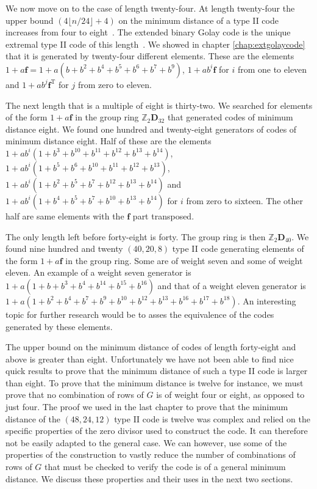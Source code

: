 We now move on to the case of length twenty-four.
At length twenty-four the upper bound $(4\lfloor n/24 \rfloor + 4)$ on the minimum distance of a type II code increases from four to eight~\cite[p.~346]{huf03}.
The extended binary Golay code is the unique extremal type II code of this length~\cite[p.~401]{huf03}.
We showed in chapter \ref{chap:extgolaycode} that it is generated by twenty-four different elements.
These are the elements $1+a\mathbf{f} = 1 + a(b + b^2 + b^4 + b^5 + b^6 + b^7 + b^9)$, $1+ab^i\mathbf{f}$ for $i$ from one to eleven and $1+ab^j\mathbf{f}^{\textrm{T}}$ for $j$ from zero to eleven.

The next length that is a multiple of eight is thirty-two.
We searched for elements of the form $1 + a \mathbf{f}$ in the group ring $\mathbb{Z}_2 \mathbf{D}_{32}$ that generated codes of minimum distance eight.
We found one hundred and twenty-eight generators of codes of minimum distance eight.
Half of these are the elements $1 + a b^i ( 1 + b^3 + b^{10} + b^{11} + b^{12} + b^{13} + b^{14})$, $1 + a b^i ( 1 + b^5 + b^6 + b^{10} + b^{11} + b^{12} + b^{13} )$, $1 + a b^i ( 1 + b^2 + b^5 + b^7 + b^{12} + b^{13} + b^{14})$ and $1 + a b^i ( 1 + b^4 + b^5 + b^7 + b^{10} + b^{13} + b^{14})$ for $i$ from zero to sixteen.
The other half are same elements with the $\mathbf{f}$ part transposed.

The only length left before forty-eight is forty.
The group ring is then $\mathbb{Z}_2 \mathbf{D}_{40}$.
We found nine hundred and twenty $(40,20,8)$ type II code generating elements of the form $1 + a \mathbf{f}$ in the group ring.
Some are of weight seven and some of weight eleven.
An example of a weight seven generator is $1 + a ( 1 + b + b^3 + b^4 + b^{14} + b^{15} + b^{16} )$ and that of a weight eleven generator is $1 + a ( 1 + b^2 + b^4 + b^7 + b^9 + b^{10} + b^{12} + b^{13} + b^{16} + b^{17} + b^{18})$.
An interesting topic for further research would be to asses the equivalence of the codes generated by these elements.

The upper bound on the minimum distance of codes of length forty-eight and above is greater than eight.
Unfortunately we have not been able to find nice quick results to prove that the minimum distance of such a type II code is larger than eight.
To prove that the minimum distance is twelve for instance, we must prove that no combination of rows of $G$ is of weight four or eight, as opposed to just four.
The proof we used in the last chapter to prove that the minimum distance of the $(48,24,12)$ type II code is twelve was complex and relied on the specific properties of the zero divisor used to construct the code.
It can therefore not be easily adapted to the general case.
We can however, use some of the properties of the construction to vastly reduce the number of combinations of rows of $G$ that must be checked to verify the code is of a general minimum distance.
We discuss these properties and their uses in the next two sections.

